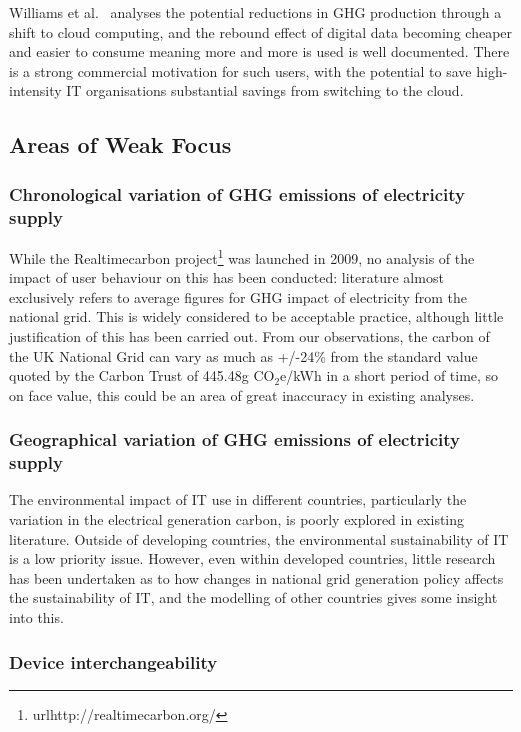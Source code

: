 \documentclass[conference]{IEEEtran}
\begin{document}
Williams et al.~\cite{williams-et-al:2014} analyses the potential
reductions in GHG production through a shift to cloud computing, and
the rebound effect of digital data becoming cheaper and easier to
consume meaning more and more is used is well documented. There is a
strong commercial motivation for such users, with the potential to
save high-intensity IT organisations substantial savings from
switching to the cloud.

\subsection{Areas of Weak Focus}

\subsubsection{Chronological variation of GHG emissions of electricity
  supply}

While the Realtimecarbon project\footnote{url{http://realtimecarbon.org/}}
was launched in 2009, no analysis of the impact of user behaviour
on this has been conducted: literature almost exclusively refers to
average figures for GHG impact of electricity from the national
grid. This is widely considered to be acceptable practice, although
little justification of this has been carried out. From our
observations, the carbon of the UK National Grid can vary as much as
+/-24\% from the standard value quoted by the Carbon Trust of 445.48g
CO$_2$e/kWh in a short period of time, so on face value, this could be
an area of great inaccuracy in existing analyses.

\subsubsection{Geographical variation of GHG emissions of electricity
  supply}

The environmental impact of IT use in different countries,
particularly the variation in the electrical generation carbon, is
poorly explored in existing literature. Outside of developing
countries, the environmental sustainability of IT is a low priority
issue. However, even within developed countries, little research has
been undertaken as to how changes in national grid generation policy
affects the sustainability of IT, and the modelling of other countries
gives some insight into this.

\subsubsection{Device interchangeability}
\end{document}
